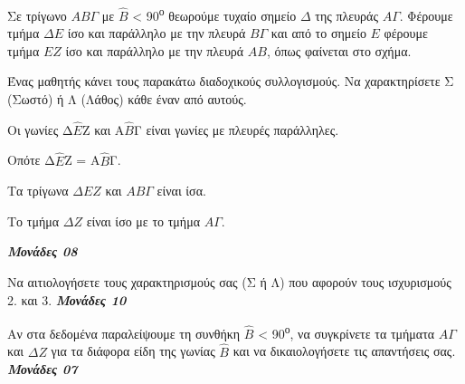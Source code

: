 \documentclass[11pt,a4paper,twoside]{book}
\newcommand{\monades}[1]{
\hspace*{\fill}
\textbf{\textit{\textcolor{maincolor}{Μονάδες #1}}}}
\begin{document}
Σε τρίγωνο $AB\varGamma $ με $\hat{B}$ < 90\textsuperscript{ο} θεωρούμε τυχαίο σημείο $\varDelta  $ της πλευράς $A\varGamma $. Φέρουμε τμήμα $\varDelta  E$ ίσο και παράλληλο με την πλευρά $B\varGamma $ και από το σημείο $E$ φέρουμε τμήμα $EZ$ ίσο και παράλληλο με την πλευρά $AB$, όπως φαίνεται στο σχήμα.

\begin{alist}
\item Ένας μαθητής κάνει τους παρακάτω διαδοχικούς συλλογισμούς. Να χαρακτηρίσετε Σ (Σωστό) ή Λ (Λάθος) κάθε έναν από αυτούς.

\begin{alist}
\item
  Οι γωνίες Δ$\hat{E}$Ζ και Α$\hat{B}$Γ είναι γωνίες με πλευρές παράλληλες.
\item
  Οπότε Δ$\hat{E}$Ζ = Α$\hat{B}$Γ.
\item
  Τα τρίγωνα $\varDelta  EZ$ και $AB\varGamma $ είναι ίσα.
\item
  Το τμήμα $\varDelta   Z$ είναι ίσο με το τμήμα $A\varGamma $.

\monades{08}

\item Να αιτιολογήσετε τους χαρακτηρισμούς σας (Σ ή Λ) που αφορούν τους ισχυρισμούς 2. και 3. \monades{10}

\item Αν στα δεδομένα παραλείψουμε τη συνθήκη $\hat{B}$ < 90\textsuperscript{ο}, να συγκρίνετε τα τμήματα $A\varGamma $ και $\varDelta   Z$ για τα διάφορα είδη της γωνίας $\hat{B}$ και να δικαιολογήσετε τις απαντήσεις σας. \monades{07}


\begin{center}
\end{center}
\end{alist}
\end{alist}
\end{document}
